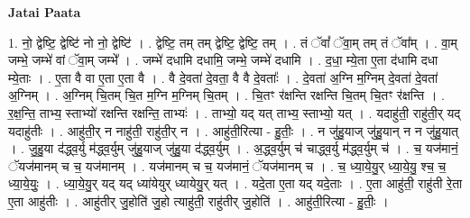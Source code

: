 \documentclass[17pt]{extarticle}
\begin{document}
\textbf{Jatai Paata} \newline

1. नो॒ द्वेष्टि॒ द्वेष्टि॑ नो नो॒ द्वेष्टि॑ । . द्वेष्टि॒ तम् तम् द्वेष्टि॒ द्वेष्टि॒ तम् । . तं ॅवां᳚ ॅवा॒म् तम् तं ॅवा᳚म् । . वा॒म् जम्भे॒ जम्भे॑ वां ॅवा॒म् जम्भे᳚ । . जम्भे॑ दधामि दधामि॒ जम्भे॒ जम्भे॑ दधामि । . द॒धा॒ म्ये॒ता ए॒ता द॑धामि दधा म्ये॒ताः । . ए॒ता वै वा ए॒ता ए॒ता वै । . वै दे॒वता॑ दे॒वता॒ वै वै दे॒वताः᳚ । . दे॒वता॑ अ॒ग्नि म॒ग्निम् दे॒वता॑ दे॒वता॑ अ॒ग्निम् । . अ॒ग्निम् चि॒तम् चि॒त म॒ग्नि म॒ग्निम् चि॒तम् । . चि॒तꣳ र॑क्षन्ति रक्षन्ति चि॒तम् चि॒तꣳ र॑क्षन्ति । . र॒क्ष॒न्ति॒ ताभ्य॒ स्ताभ्यो॑ रक्षन्ति रक्षन्ति॒ ताभ्यः॑ । . ताभ्यो॒ यद् यत् ताभ्य॒ स्ताभ्यो॒ यत् । . यदाहु॑ती॒ राहु॑ती॒र् यद् यदाहु॑तीः । . आहु॑ती॒र् न नाहु॑ती॒ राहु॑ती॒र् न । . आहु॑ती॒रित्या - हु॒तीः॒ । . न जु॑हु॒याज् जु॑हु॒यान् न न जु॑हु॒यात् । . जु॒हु॒या द॑द्ध्व॒र्यु म॑द्ध्व॒र्युम् जु॑हु॒याज् जु॑हु॒या द॑द्ध्व॒र्युम् । . अ॒द्ध्व॒र्युम् च॑ चाद्ध्व॒र्यु म॑द्ध्व॒र्युम् च॑ । . च॒ यज॑मानं॒ ॅयज॑मानम् च च॒ यज॑मानम् । . यज॑मानम् च च॒ यज॑मानं॒ ॅयज॑मानम् च । . च॒ ध्या॒ये॒यु॒र् ध्या॒ये॒यु॒ श्च॒ च॒ ध्या॒ये॒युः॒ । . ध्या॒ये॒यु॒र् यद् यद् ध्या॑येयुर् ध्यायेयु॒र् यत् । . यदे॒ता ए॒ता यद् यदे॒ताः । . ए॒ता आहु॑ती॒ राहु॑ती रे॒ता ए॒ता आहु॑तीः । . आहु॑तीर् जु॒होति॑ जु॒हो त्याहु॑ती॒ राहु॑तीर् जु॒होति॑ । . आहु॑ती॒रित्या - हु॒तीः॒ । \newline
\end{document}
